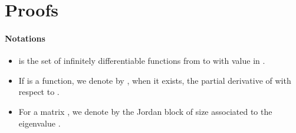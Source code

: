 \documentclass{article}
\begin{document}
\section{Proofs}\label{app:proofs}

\paragraph{Notations}
\begin{itemize}
    \item  is the set of  infinitely differentiable functions from  to  with value  in .
    \item If  is a function, we denote by , when it exists, the partial derivative of  with respect to .
    \item For a matrix , we denote by  the Jordan block of size  associated to the eigenvalue  .
\end{itemize}




\setcounter{subsection}{-1}
\end{document}
